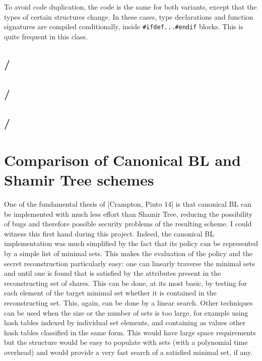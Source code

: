 \documentclass{article}
\begin{document}
To avoid code duplication, the code is the same for both variants, except that the types of certain structures change. In these cases, type declarations and function signatures are compiled conditionally, inside \verb|#ifdef...#endif| blocks. This is quite frequent in this class.




\subsection{\fhblcanon / \fcblcanon}

\subsection{\fhtree / \fctree}

\subsection{\fhshtree / \fcshtree}

\section{Comparison of Canonical BL and Shamir Tree schemes}

One of the fundamental thesis of [Crampton, Pinto 14] is that canonical BL can be implemented with much less effort than Shamir Tree, reducing the possibility of bugs and therefore possible security problems of the resulting scheme. I could witness this first hand during this project. Indeed, the canonical BL implementation was much simplified by the fact that its policy can be represented by a simple list of minimal sets. This makes the evaluation of the policy and the secret reconstruction particularly easy: one can linearly traverse the minimal sets and until one is found that is satisfied by the attributes present in the reconstructing set of shares. This can be done, at its most basic, by testing for each element of the target minimal set whether it is contained in the reconstructing set. This, again, can be done by a linear search. Other techniques can be used when the size or the number of sets is too large, for example using hash tables indexed by individual set elements, and containing as values other hash tables classified in the same form. This would have large space requirements but the structure would be easy to populate with sets (with a polynomial time overhead) and would provide a very fast search of a satisfied minimal set, if any.
\end{document}
